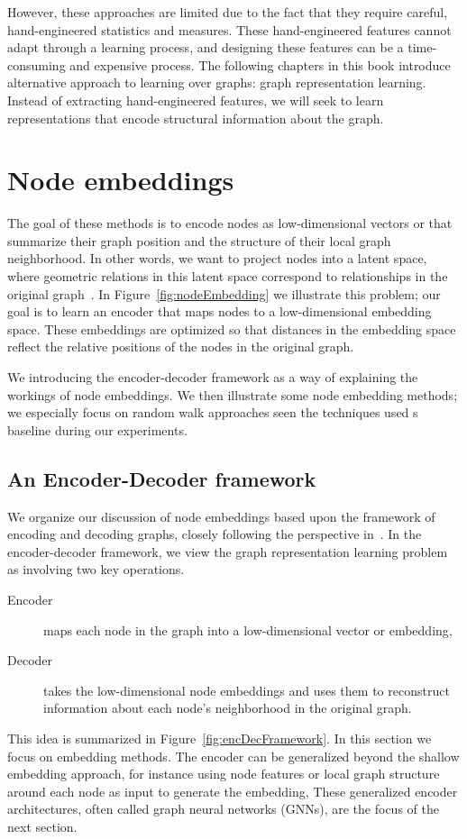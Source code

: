 However, these approaches are limited due to the fact that they require careful, hand-engineered statistics and measures. These hand-engineered features cannot adapt through a learning process, and designing these features can be a time-consuming and expensive process. The following chapters in this book introduce alternative approach to learning over graphs: graph representation learning. Instead of extracting hand-engineered features, we will seek to learn representations that encode structural information about the graph.

\section{Node embeddings}\label{sec:shallowEmbeddings}
The goal of these methods is to encode nodes as low-dimensional vectors or  that summarize their graph position and the structure of their local graph neighborhood. In other words, we want to project nodes into a latent space, where geometric relations in this latent space correspond to relationships in the original graph~\cite{Hoff2002latentSpaceApproachesSocialNetworkAnalysis}. In Figure~\ref{fig:nodeEmbedding} we illustrate this problem; our goal is to learn an encoder that maps nodes to a low-dimensional embedding space. These embeddings are optimized so that distances in the embedding space reflect the relative positions of the nodes in the original graph. 

We introducing the encoder-decoder framework as a way of explaining the workings of node embeddings. We then illustrate some node embedding methods; we especially focus on random walk approaches seen the techniques used s baseline during our experiments.

\subsection{An Encoder-Decoder framework}
We organize our discussion of node embeddings based upon the framework of encoding and decoding graphs, closely following the perspective in~\cite{Hamilton2020GraphRL}. In the encoder-decoder framework, we view the graph representation learning problem as involving two key operations. 
\begin{description}
    \item[Encoder] maps each node in the graph into a low-dimensional vector or embedding,
    \item[Decoder] takes the low-dimensional node embeddings and uses them to reconstruct information about each node's neighborhood in the original graph.
\end{description}
This idea is summarized in Figure~\ref{fig:encDecFramework}.
In this section we focus on  embedding methods. The encoder can be generalized beyond the shallow embedding approach, for instance using node features or local graph structure around each node as input to generate the embedding, These generalized encoder architectures, often called graph neural networks (GNNs), are the focus of the next section.

